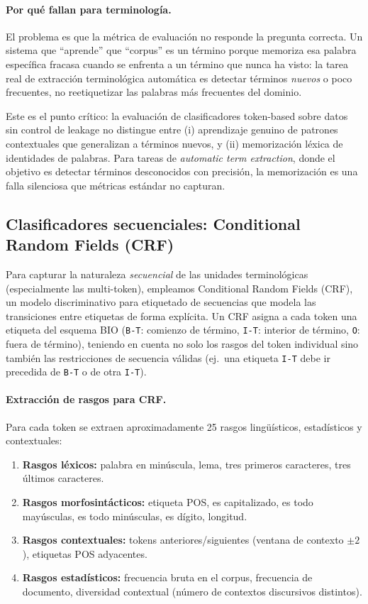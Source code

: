 \paragraph{Por qué fallan para terminología.}
El problema es que la métrica de evaluación no responde la pregunta correcta. Un sistema que ``aprende'' que ``corpus'' es un término porque memoriza esa palabra específica fracasa cuando se enfrenta a un término que nunca ha visto: la tarea real de extracción terminológica automática es detectar términos \emph{nuevos} o poco frecuentes, no reetiquetizar las palabras más frecuentes del dominio.

Este es el punto crítico: la evaluación de clasificadores token-based sobre datos sin control de leakage no distingue entre (i) aprendizaje genuino de patrones contextuales que generalizan a términos nuevos, y (ii) memorización léxica de identidades de palabras. Para tareas de \emph{automatic term extraction}, donde el objetivo es detectar términos desconocidos con precisión, la memorización es una falla silenciosa que métricas estándar no capturan.

\subsection{Clasificadores secuenciales: Conditional Random Fields (CRF)}
\label{subsec:crf}

Para capturar la naturaleza \emph{secuencial} de las unidades terminológicas (especialmente las multi-token), empleamos Conditional Random Fields (CRF), un modelo discriminativo para etiquetado de secuencias que modela las transiciones entre etiquetas de forma explícita. Un CRF asigna a cada token una etiqueta del esquema BIO (\texttt{B-T}: comienzo de término, \texttt{I-T}: interior de término, \texttt{O}: fuera de término), teniendo en cuenta no solo los rasgos del token individual sino también las restricciones de secuencia válidas (ej.\ una etiqueta \texttt{I-T} debe ir precedida de \texttt{B-T} o de otra \texttt{I-T}).

\paragraph{Extracción de rasgos para CRF.}
Para cada token se extraen aproximadamente 25 rasgos lingüísticos, estadísticos y contextuales:

\begin{enumerate}
    \item \textbf{Rasgos léxicos:} palabra en minúscula, lema, tres primeros caracteres, tres últimos caracteres.
    \item \textbf{Rasgos morfosintácticos:} etiqueta POS, es capitalizado, es todo mayúsculas, es todo minúsculas, es dígito, longitud.
    \item \textbf{Rasgos contextuales:} tokens anteriores/siguientes (ventana de contexto $\pm 2$), etiquetas POS adyacentes.
    \item \textbf{Rasgos estadísticos:} frecuencia bruta en el corpus, frecuencia de documento, diversidad contextual (número de contextos discursivos distintos).
\end{enumerate}

